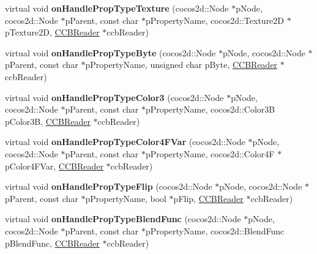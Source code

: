 \begin{DoxyCompactItemize}
virtual void {\bfseries on\+Handle\+Prop\+Type\+Texture} (cocos2d\+::\+Node $\ast$p\+Node, cocos2d\+::\+Node $\ast$p\+Parent, const char $\ast$p\+Property\+Name, cocos2d\+::\+Texture2D $\ast$p\+Texture2D, \hyperlink{classcocosbuilder_1_1CCBReader}{C\+C\+B\+Reader} $\ast$ccb\+Reader)
\item 
\mbox{\label{classcocosbuilder_1_1NodeLoader_aefe5e73fb9ecc1e00c0fd5d8ec0fd436}} 
virtual void {\bfseries on\+Handle\+Prop\+Type\+Byte} (cocos2d\+::\+Node $\ast$p\+Node, cocos2d\+::\+Node $\ast$p\+Parent, const char $\ast$p\+Property\+Name, unsigned char p\+Byte, \hyperlink{classcocosbuilder_1_1CCBReader}{C\+C\+B\+Reader} $\ast$ccb\+Reader)
\item 
\mbox{\label{classcocosbuilder_1_1NodeLoader_ae3f8520803b8c8ea936f9cbe5f21ded0}} 
virtual void {\bfseries on\+Handle\+Prop\+Type\+Color3} (cocos2d\+::\+Node $\ast$p\+Node, cocos2d\+::\+Node $\ast$p\+Parent, const char $\ast$p\+Property\+Name, cocos2d\+::\+Color3B p\+Color3B, \hyperlink{classcocosbuilder_1_1CCBReader}{C\+C\+B\+Reader} $\ast$ccb\+Reader)
\item 
\mbox{\label{classcocosbuilder_1_1NodeLoader_a96295e42e1301d53051dfaf726290a4a}} 
virtual void {\bfseries on\+Handle\+Prop\+Type\+Color4\+F\+Var} (cocos2d\+::\+Node $\ast$p\+Node, cocos2d\+::\+Node $\ast$p\+Parent, const char $\ast$p\+Property\+Name, cocos2d\+::\+Color4F $\ast$p\+Color4\+F\+Var, \hyperlink{classcocosbuilder_1_1CCBReader}{C\+C\+B\+Reader} $\ast$ccb\+Reader)
\item 
\mbox{\label{classcocosbuilder_1_1NodeLoader_a95098376b6f929d7c5199d51daaec32b}} 
virtual void {\bfseries on\+Handle\+Prop\+Type\+Flip} (cocos2d\+::\+Node $\ast$p\+Node, cocos2d\+::\+Node $\ast$p\+Parent, const char $\ast$p\+Property\+Name, bool $\ast$p\+Flip, \hyperlink{classcocosbuilder_1_1CCBReader}{C\+C\+B\+Reader} $\ast$ccb\+Reader)
\item 
\mbox{\label{classcocosbuilder_1_1NodeLoader_af9fd25689164688af528603f26cc2d42}} 
virtual void {\bfseries on\+Handle\+Prop\+Type\+Blend\+Func} (cocos2d\+::\+Node $\ast$p\+Node, cocos2d\+::\+Node $\ast$p\+Parent, const char $\ast$p\+Property\+Name, cocos2d\+::\+Blend\+Func p\+Blend\+Func, \hyperlink{classcocosbuilder_1_1CCBReader}{C\+C\+B\+Reader} $\ast$ccb\+Reader)

\end{DoxyCompactItemize}
